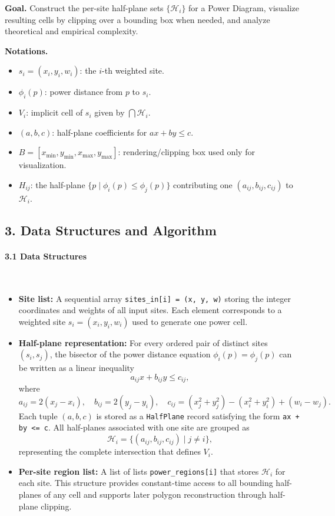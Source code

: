 \documentclass{article}
\begin{document}
\textbf{Goal.}  
Construct the per-site half-plane sets $\{\mathcal{H}_i\}$ for a Power Diagram, visualize resulting cells by clipping over a bounding box when needed, and analyze theoretical and empirical complexity.

\textbf{Notations.}  
\begin{itemize}
  \item $s_i=(x_i,y_i,w_i)$: the $i$-th weighted site.
  \item $\phi_i(p)$: power distance from $p$ to $s_i$.
  \item $V_i$: implicit cell of $s_i$ given by $\bigcap \mathcal{H}_i$.
  \item $(a,b,c)$: half-plane coefficients for $ax+by\le c$.
  \item $B=[x_{\min},y_{\min},x_{\max},y_{\max}]$: rendering/clipping box used only for visualization.
  \item $H_{ij}$: the half-plane $\{p\mid \phi_i(p)\le \phi_j(p)\}$ contributing one $(a_{ij},b_{ij},c_{ij})$ to $\mathcal{H}_i$.
\end{itemize}

\subsection*{3. Data Structures and Algorithm}

\paragraph{3.1 Data Structures}\

\begin{itemize}
    \item \textbf{Site list:}  
    A sequential array \texttt{sites\_in[i] = (x, y, w)} storing the integer coordinates and weights of all input sites.  
    Each element corresponds to a weighted site $s_i = (x_i, y_i, w_i)$ used to generate one power cell.

    \item \textbf{Half-plane representation:}  
    For every ordered pair of distinct sites $(s_i, s_j)$, the bisector of the power distance equation $\phi_i(p)=\phi_j(p)$
    can be written as a linear inequality
    \[
    a_{ij}x + b_{ij}y \le c_{ij},
    \]
    where 
    \[
    a_{ij} = 2(x_j - x_i), \quad
    b_{ij} = 2(y_j - y_i), \quad
    c_{ij} = (x_j^2 + y_j^2) - (x_i^2 + y_i^2) + (w_i - w_j).
    \]
    Each tuple $(a,b,c)$ is stored as a \texttt{HalfPlane} record satisfying the form \texttt{ax + by <= c}.  
    All half-planes associated with one site are grouped as
    \[
    \mathcal{H}_i = \{(a_{ij}, b_{ij}, c_{ij}) \mid j \ne i\},
    \]
    representing the complete intersection that defines $V_i$.

    \item \textbf{Per-site region list:}  
    A list of lists \texttt{power\_regions[i]} that stores $\mathcal{H}_i$ for each site.  
    This structure provides constant-time access to all bounding half-planes of any cell and supports later polygon reconstruction through half-plane clipping.

    \end{itemize}
\end{document}
